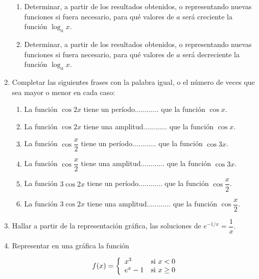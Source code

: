 \begin{enumerate}[leftmargin=*]
\begin{enumerate}
\item Determinar, a partir de los resultados obtenidos, o representando nuevas funciones si fuera necesario, para qué valores de $a$ será creciente la función $\log_{a}{x}$.

\item Determinar, a partir de los resultados obtenidos, o representando nuevas funciones si fuera necesario, para qué valores de $a$ será decreciente la función $\log_{a}{x}$.


\end{enumerate}

\item Completar las siguientes frases con la palabra igual, o el número de veces que sea mayor o menor en cada caso:

\begin{enumerate}

\item La función $\cos{2x}$ tiene un período............ que la función $\cos{x}$.

\item La función $\cos{2x}$ tiene una amplitud............ que la función $\cos{x}$.

\item La función $\cos\dfrac{x}{2}$ tiene un período............ que la función $\cos{3x}$.

\item La función $\cos\dfrac{x}{2}$ tiene una amplitud............ que la función $\cos{3x}$.

\item La función $3\cos{2x}$ tiene un período............ que la función $\cos\dfrac{x}{2}$.

\item La función $3\cos{2x}$ tiene una amplitud............ que la función $\cos\dfrac{x}{2}$.

\end{enumerate}

\item Hallar a partir de la representación gráfica, las soluciones de $e^{-1/x}=\dfrac{1}{x}$.

\item Representar en una gráfica la función

\[
\ f(x)=\left\{%
\begin{array}{ll}
    x^{3} & \hbox{si $x<0$} \\
    e^{x}-1 & \hbox{si $x\geq0$} \\
\end{array}%
\right.
\]

\end{enumerate}










